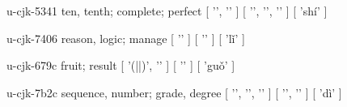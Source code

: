 \begin{multicols}{2}
\lettrine[lines=3]{\cjkgGlue{}}{}\begin{minipage}{0.8\linewidth} u-cjk-5341  ten, tenth; complete; perfect  [ '\cjkgGlue{}', '\cjkgGlue{}' ]  [ '\cjkgGlue{}', '\cjkgGlue{}', '\cjkgGlue{}' ]  [ 'shí' ] \end{minipage}

\lettrine[lines=3]{\cjkgGlue{}}{}\begin{minipage}{0.8\linewidth} u-cjk-7406  reason, logic; manage  [ '\cjkgGlue{}' ]  [ '\cjkgGlue{}' ]  [ 'lǐ' ] \end{minipage}

\lettrine[lines=3]{\cjkgGlue{}}{}\begin{minipage}{0.8\linewidth} u-cjk-679c  fruit; result  [ '\cjkgGlue{}(\cjkgGlue{}|\cjkgGlue{}|\cjkgGlue{})', '\cjkgGlue{}' ]  [ '\cjkgGlue{}' ]  [ 'guǒ' ] \end{minipage}

\lettrine[lines=3]{\cjkgGlue{}}{}\begin{minipage}{0.8\linewidth} u-cjk-7b2c  sequence, number; grade, degree  [ '\cjkgGlue{}', '\cjkgGlue{}', '\cjkgGlue{}' ]  [ '\cjkgGlue{}', '\cjkgGlue{}' ]  [ 'dì' ] \end{minipage}


\end{multicols}
